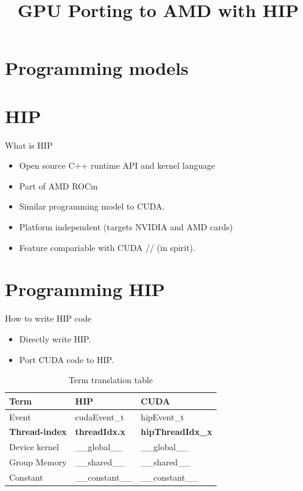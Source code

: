 \documentclass[aspectratio=169]{beamer}
\title{GPU Porting to AMD with HIP}
\author{}
\date{}
\begin{document}
\newcommand{\rom}[1]{\uppercase\expandafter{\romannumeral #1\relax}}
\begin{frame}
\titlepage
\end{frame}




\section{Programming models}


\section{HIP}

\begin{frame}{What is HIP}
    \begin{itemize}
        \item Open source C++ runtime API and kernel language
        \item Part of AMD ROCm
        \item Similar programming model to CUDA.
        \item Platform independent (targets NVIDIA and AMD cards)
        \item Feature compariable with CUDA // (in spirit).
    \end{itemize}
\end{frame}



\section{Programming HIP}

\begin{frame}{How to write HIP code}

\begin{itemize}
    \item Directly write HIP.
    \item Port CUDA code to HIP.
\end{itemize}

\begin{table}[]
    \centering
    \begin{tabular}{l|l|l}
Term & HIP & CUDA\\\hline
Event & cudaEvent\_t & hipEvent\_t\\
\textbf{Thread-index} & \textbf{threadIdx.x} & \textbf{hipThreadIdx\_x}\\
Device kernel & \_\_global\_\_ & \_\_global\_\_\\
Group Memory &  \_\_shared\_\_ & \_\_shared\_\_\\
Constant & \_\_constant\_\_ & \_\_constant\_\_\\
\end{tabular}
    \caption{Term translation table}
    \label{tab:term_translate}
\end{table}

\end{frame}
\end{document}
